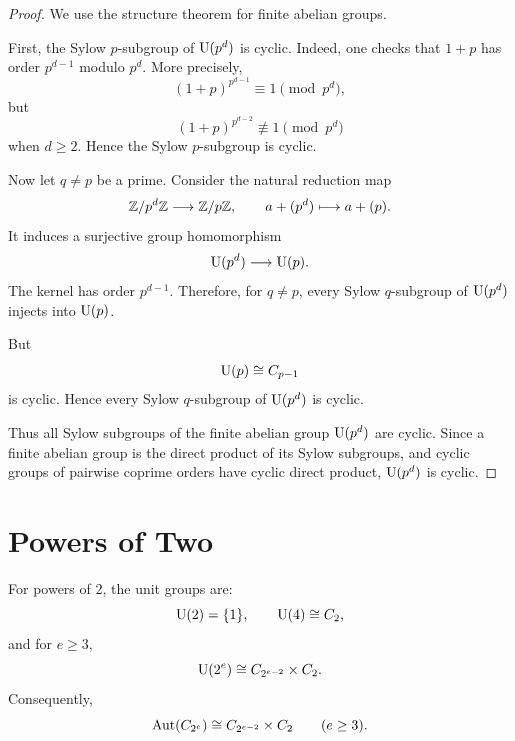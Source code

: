 \begin{proof}
We use the structure theorem for finite abelian groups.

First, the Sylow $p$-subgroup of $\mathrm{U}(p^d)$ is cyclic. Indeed, one checks that $1+p$ has order $p^{d-1}$ modulo $p^d$. More precisely,
\[
    (1+p)^{p^{d-1}}\equiv1\pmod{p^d},
\]
but
\[
    (1+p)^{p^{d-2}}\not\equiv1\pmod{p^d}
\]
when $d\geq2$. Hence the Sylow $p$-subgroup is cyclic.

Now let $q\neq p$ be a prime. Consider the natural reduction map
\[
    \mathbb{Z}/p^d\mathbb{Z}\longrightarrow \mathbb{Z}/p\mathbb{Z},
    \qquad
    a+(p^d)\longmapsto a+(p).
\]
It induces a surjective group homomorphism
\[
    \mathrm{U}(p^d)\longrightarrow \mathrm{U}(p).
\]
The kernel has order $p^{d-1}$. Therefore, for $q\neq p$, every Sylow $q$-subgroup of $\mathrm{U}(p^d)$ injects into $\mathrm{U}(p)$.

But
\[
    \mathrm{U}(p)\cong C_{p-1}
\]
is cyclic. Hence every Sylow $q$-subgroup of $\mathrm{U}(p^d)$ is cyclic.

Thus all Sylow subgroups of the finite abelian group $\mathrm{U}(p^d)$ are cyclic. Since a finite abelian group is the direct product of its Sylow subgroups, and cyclic groups of pairwise coprime orders have cyclic direct product, $\mathrm{U}(p^d)$ is cyclic.
\end{proof}

\section{Powers of Two}

\begin{theorem}\label{thm:two-power}
For powers of $2$, the unit groups are:
\[
    \mathrm{U}(2)=\{1\},
    \qquad
    \mathrm{U}(4)\cong C_2,
\]
and for $e\geq3$,
\[
    \mathrm{U}(2^e)\cong C_{2^{e-2}}\times C_2.
\]
Consequently,
\[
    \operatorname{Aut}(C_{2^e})\cong C_{2^{e-2}}\times C_2
    \qquad(e\geq3).
\]
\end{theorem}

